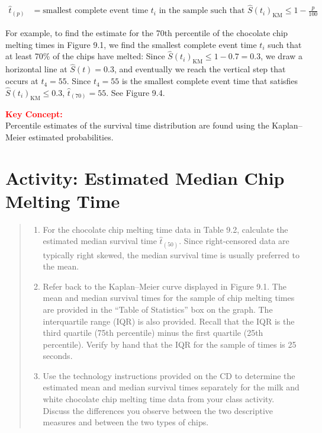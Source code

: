 \documentclass[
]{report}
\providecommand{\tightlist}{%
  \setlength{\itemsep}{0pt}\setlength{\parskip}{0pt}}
\begin{document}
\begin{align}\label{9.5}
\hat t_{(p)} &= \text{smallest complete event time }t_i\text{ in the sample such that } \hat S(t_i)_{\mathrm{KM}} \le 1 - \frac{p}{100}
\tag{9.5}
\end{align}

For example, to find the estimate for the 70th percentile of the chocolate chip melting times in Figure 9.1, we find the smallest complete event time \(t_i\) such that at least 70\% of the chips have melted: Since \(\hat S(t_i)_{\mathrm{KM}} \le 1 - 0.7 = 0.3\), we draw a horizontal line at \(\hat S(t) = 0.3\), and eventually we reach the vertical step that occurs at \(t_4 = 55\). Since \(t_4 = 55\) is the smallest complete event time that satisfies \(\hat S(t_i)_{\mathrm{KM}} \le 0.3\), \(\hat t_{(70)} = 55\). See Figure 9.4.

\large

\textbf{\textcolor{red}{Key Concept:}}\\
\color{red}
Percentile estimates of the survival time distribution are found using the Kaplan--Meier estimated probabilities.\\
\color{black}
\normalsize

\section*{Activity: Estimated Median Chip Melting Time}\label{activity-estimated-median-chip-melting-time}

\begin{quote}
\begin{enumerate}
\def\labelenumi{\arabic{enumi}.}
\setcounter{enumi}{22}
\tightlist
\item
  For the chocolate chip melting time data in Table 9.2, calculate the estimated median survival time \(\hat t_{(50)}\). Since right-censored data are typically right skewed, the median survival time is usually preferred to the mean.\\
\item
  Refer back to the Kaplan--Meier curve displayed in Figure 9.1. The mean and median survival times for the sample of chip melting times are provided in the ``Table of Statistics'' box on the graph. The interquartile range (IQR) is also provided. Recall that the IQR is the third quartile (75th percentile) minus the first quartile (25th percentile). Verify by hand that the IQR for the sample of times is 25 seconds.\\
\item
  Use the technology instructions provided on the CD to determine the estimated mean and median survival times separately for the milk and white chocolate chip melting time data from your class activity. Discuss the differences you observe between the two descriptive measures and between the two types of chips.
\end{enumerate}
\end{quote}
\end{document}

